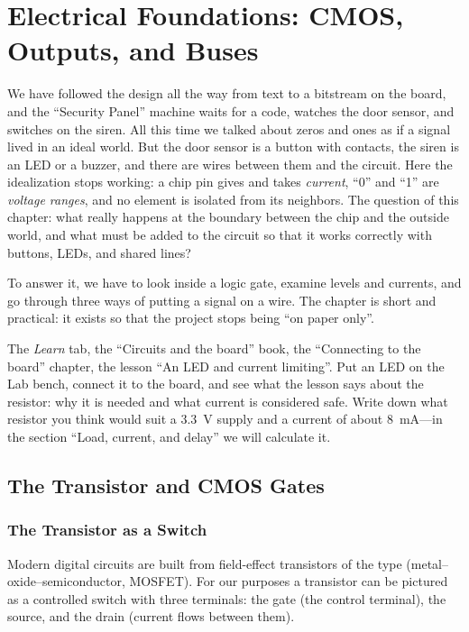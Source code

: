 \chapter{Electrical Foundations: CMOS, Outputs, and Buses}
\label{ch:electrical}

We have followed the design all the way from text to a bitstream on the board,
and the ``Security Panel'' machine waits for a code, watches the
door sensor, and switches on the siren. All this time we talked about zeros and
ones as if a signal lived in an ideal world. But the door sensor is a button with
contacts, the siren is an LED or a buzzer, and there are wires between them and the
circuit. Here the idealization stops working: a chip pin gives and takes
\emph{current}, ``0'' and ``1'' are \emph{voltage ranges}, and no
element is isolated from its neighbors. The question of this chapter: what really happens
at the boundary between the chip and the outside world, and what must be added to the circuit so that it
works correctly with buttons, LEDs, and shared lines?

To answer it, we have to look inside a logic gate, examine
levels and currents, and go through three ways of putting a signal on a wire. The chapter is short
and practical: it exists so that the project stops being ``on paper only''.

\begin{buildbox}
The \emph{Learn} tab, the ``Circuits and the board'' book, the ``Connecting to the board'' chapter, the lesson
``An LED and current limiting''. Put an LED on the Lab bench,
connect it to the board, and see what the lesson says about the resistor: why
it is needed and what current is considered safe. Write down what resistor
you think would suit a 3.3~V supply and a current of about 8~mA---in the section
``Load, current, and delay'' we will calculate it.
\end{buildbox}

\section{The Transistor and CMOS Gates}

\subsection{The Transistor as a Switch}

Modern digital circuits are built from field-effect transistors of the 
type (metal--oxide--semiconductor, MOSFET). For our purposes a transistor can be
pictured as a controlled switch with three terminals: the gate (the control terminal),
the source, and the drain (current flows between them).

